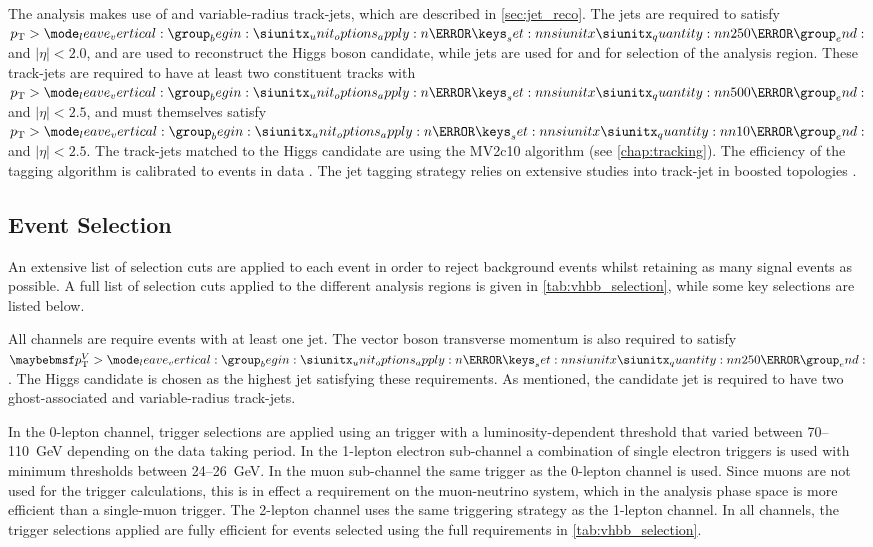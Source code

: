 The analysis makes use of \largeR and variable-radius \smallR track-jets, which are described in \cref{sec:jet_reco}.
The \largeR jets are required to satisfy $\pt > \SI{250}{\GeV}$ and $|\eta| < 2.0$, and are used to reconstruct the Higgs boson candidate, while \smallR jets are used for \btagging and for selection of the analysis region.
These track-jets are required to have at least two constituent tracks with $\pt > \SI{500}{\MeV}$ and $|\eta| < 2.5$, and must themselves satisfy $\pt > \SI{10}{\GeV}$ and $|\eta| < 2.5$.
The track-jets matched to the Higgs candidate are \btagged using the MV2c10 \btagging algorithm (see \cref{chap:tracking}).
The efficiency of the tagging algorithm is calibrated to events in data \cite{PERF-2016-05,ATLAS-CONF-2018-006,ATLAS-CONF-2018-001}.
The jet tagging strategy relies on extensive studies into track-jet \btagging in boosted topologies \cite{ATL-PHYS-PUB-2014-013, PERF-2017-04}.



\subsection{Event Selection}\label{sec:vhbb_selections}

An extensive list of selection cuts are applied to each event in order to reject background events whilst retaining as many signal events as possible. 
A full list of selection cuts applied to the different analysis regions is given in \cref{tab:vhbb_selection}, while some key selections are listed below.

All channels are require events with at least one \largeR jet.
The vector boson transverse momentum is also required to satisfy $\ptv > \SI{250}{\GeV}$.
The Higgs candidate is chosen as the highest \pt \largeR jet satisfying these requirements.
As mentioned, the candidate \largeR jet is required to have two ghost-associated and \btagged variable-radius track-jets.

In the 0-lepton channel, trigger selections are applied using an \ETmiss trigger with a luminosity-dependent threshold that varied between 70--\SI{110}{\GeV} depending on the data taking period.
In the 1-lepton electron sub-channel a combination of single electron triggers is used with minimum \pt thresholds between 24--\SI{26}{\GeV}.
In the muon sub-channel the same \ETmiss trigger as the 0-lepton channel is used.
Since muons are not used for the \ETmiss trigger calculations, this is in effect a \pt requirement on the muon-neutrino system, which in the analysis phase space is more efficient than a single-muon trigger.
The 2-lepton channel uses the same triggering strategy as the 1-lepton channel.
In all channels, the trigger selections applied are fully efficient for events selected using the full requirements in \cref{tab:vhbb_selection}.

